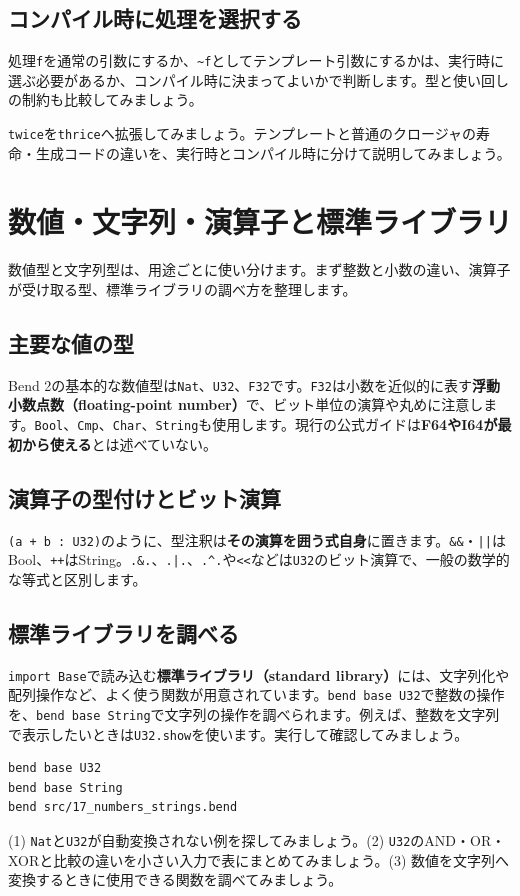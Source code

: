 \documentclass[11pt,a4paper,openany]{book}
\newcommand{\code}[1]{\texttt{#1}}
\newcommand{\term}[1]{\textbf{#1}}
\newcommand{\readcode}[2]{}
\newcommand{\exercise}[1]{\begin{exercisebox}#1\end{exercisebox}}
\begin{document}
\section{コンパイル時に処理を選択する}
処理\code{f}を通常の引数にするか、\code{\textasciitilde{}f}としてテンプレート引数にするかは、実行時に選ぶ必要があるか、コンパイル時に決まってよいかで判断します。型と使い回しの制約も比較してみましょう。
\exercise{\code{twice}を\code{thrice}へ拡張してみましょう。テンプレートと普通のクロージャの寿命・生成コードの違いを、実行時とコンパイル時に分けて説明してみましょう。}

\chapter{数値・文字列・演算子と標準ライブラリ}
\begin{tcolorbox}[colback=blue!3,colframe=blue!16,boxrule=.35pt,arc=1mm,left=3mm,right=3mm,top=2mm,bottom=2mm]
\small 数値型と文字列型は、用途ごとに使い分けます。まず整数と小数の違い、演算子が受け取る型、標準ライブラリの調べ方を整理します。
\end{tcolorbox}

\section{主要な値の型}
Bend 2の基本的な数値型は\code{Nat}、\code{U32}、\code{F32}です。\code{F32}は小数を近似的に表す\term{浮動小数点数（floating-point number）}で、ビット単位の演算や丸めに注意します。\code{Bool}、\code{Cmp}、\code{Char}、\code{String}も使用します。現行の公式ガイドは\term{F64やI64が最初から使える}とは述べていない。
\readcode{17_numbers_strings.bend}{整数演算と文字列化（17\_numbers\_strings.bend）}
\section{演算子の型付けとビット演算}
\code{(a + b : U32)}のように、型注釈は\term{その演算を囲う式自身}に置きます。\code{\&\&}・\code{||}はBool、\code{++}はString。\code{.\&.}、\code{.|.}、\code{.\^{}.}や\code{<<}などは\code{U32}のビット演算で、一般の数学的な等式と区別します。
\section{標準ライブラリを調べる}
\code{import Base}で読み込む\term{標準ライブラリ（standard library）}には、文字列化や配列操作など、よく使う関数が用意されています。\code{bend base U32}で整数の操作を、\code{bend base String}で文字列の操作を調べられます。例えば、整数を文字列で表示したいときは\code{U32.show}を使います。実行して確認してみましょう。
\begin{lstlisting}[caption={標準ライブラリの確認例},language={}]
bend base U32
bend base String
bend src/17_numbers_strings.bend
\end{lstlisting}
\exercise{(1) \code{Nat}と\code{U32}が自動変換されない例を探してみましょう。(2) \code{U32}のAND・OR・XORと比較の違いを小さい入力で表にまとめてみましょう。(3) 数値を文字列へ変換するときに使用できる関数を調べてみましょう。}
\end{document}
